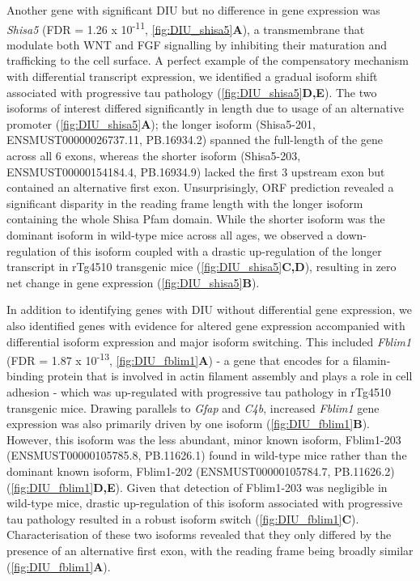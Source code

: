 Another gene with significant DIU but no difference in gene expression was \textit{Shisa5} (FDR = 1.26 x 10\textsuperscript{-11}, \cref{fig:DIU_shisa5}\textbf{A}), a transmembrane that modulate both WNT and FGF signalling by inhibiting their maturation and trafficking to the cell surface\cite{Yamamoto2005}. A perfect example of the compensatory mechanism with differential transcript expression, we identified a gradual isoform shift associated with progressive tau pathology (\cref{fig:DIU_shisa5}\textbf{D,E}). The two isoforms of interest differed significantly in length due to usage of an alternative promoter (\cref{fig:DIU_shisa5}\textbf{A}); the longer isoform (Shisa5-201, ENSMUST00000026737.11, PB.16934.2) spanned the full-length of the gene across all 6 exons, whereas the shorter isoform (Shisa5-203, ENSMUST00000154184.4, PB.16934.9) lacked the first 3 upstream exon but contained an alternative first exon. Unsurprisingly, ORF prediction revealed a significant disparity in the reading frame length with the longer isoform containing the whole Shisa Pfam domain. While the shorter isoform was the dominant isoform in wild-type mice across all ages, we observed a down-regulation of this isoform coupled with a drastic up-regulation of the longer transcript in rTg4510 transgenic mice (\cref{fig:DIU_shisa5}\textbf{C,D}), resulting in zero net change in gene expression (\cref{fig:DIU_shisa5}\textbf{B}). 

In addition to identifying genes with DIU without differential gene expression, we also identified genes with evidence for altered gene expression accompanied with differential isoform expression and major isoform switching. This included \textit{Fblim1} (FDR = 1.87 x 10\textsuperscript{-13}, \cref{fig:DIU_fblim1}\textbf{A}) - a gene that encodes for a filamin-binding protein that is involved in actin filament assembly and plays a role in cell adhesion\cite{Takafuta2003} - which was up-regulated with progressive tau pathology in rTg4510 transgenic mice. Drawing parallels to \textit{Gfap} and \textit{C4b}, increased \textit{Fblim1} gene expression was also primarily driven by one isoform (\cref{fig:DIU_fblim1}\textbf{B}). However, this isoform was the less abundant, minor known isoform, Fblim1-203 (ENSMUST00000105785.8, PB.11626.1) found in wild-type mice rather than the dominant known isoform, Fblim1-202 (ENSMUST00000105784.7, PB.11626.2) (\cref{fig:DIU_fblim1}\textbf{D,E}). Given that detection of Fblim1-203 was negligible in wild-type mice, drastic up-regulation of this isoform associated with progressive tau pathology resulted in a robust isoform switch (\cref{fig:DIU_fblim1}\textbf{C}). Characterisation of these two isoforms revealed that they only differed by the presence of an alternative first exon, with the reading frame being broadly similar (\cref{fig:DIU_fblim1}\textbf{A}). 

